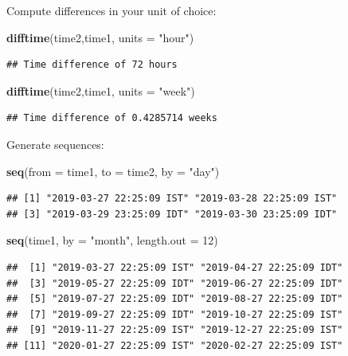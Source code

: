 \documentclass[]{book}
\newenvironment{Shaded}{\begin{snugshade}}{\end{snugshade}}
\newcommand{\DataTypeTok}[1]{\textcolor[rgb]{0.13,0.29,0.53}{#1}}
\newcommand{\DecValTok}[1]{\textcolor[rgb]{0.00,0.00,0.81}{#1}}
\newcommand{\KeywordTok}[1]{\textcolor[rgb]{0.13,0.29,0.53}{\textbf{#1}}}
\newcommand{\NormalTok}[1]{#1}
\newcommand{\StringTok}[1]{\textcolor[rgb]{0.31,0.60,0.02}{#1}}
\theoremstyle{definition}
\theoremstyle{definition}
\theoremstyle{definition}
\theoremstyle{remark}
\begin{document}
Compute differences in your unit of choice:

\begin{Shaded}
\begin{Highlighting}[]
\KeywordTok{difftime}\NormalTok{(time2,time1, }\DataTypeTok{units =}  \StringTok{"hour"}\NormalTok{)}
\end{Highlighting}
\end{Shaded}

\begin{verbatim}
## Time difference of 72 hours
\end{verbatim}

\begin{Shaded}
\begin{Highlighting}[]
\KeywordTok{difftime}\NormalTok{(time2,time1, }\DataTypeTok{units =}  \StringTok{"week"}\NormalTok{)}
\end{Highlighting}
\end{Shaded}

\begin{verbatim}
## Time difference of 0.4285714 weeks
\end{verbatim}

Generate sequences:

\begin{Shaded}
\begin{Highlighting}[]
\KeywordTok{seq}\NormalTok{(}\DataTypeTok{from =}\NormalTok{ time1, }\DataTypeTok{to =}\NormalTok{ time2, }\DataTypeTok{by =} \StringTok{"day"}\NormalTok{) }
\end{Highlighting}
\end{Shaded}

\begin{verbatim}
## [1] "2019-03-27 22:25:09 IST" "2019-03-28 22:25:09 IST"
## [3] "2019-03-29 23:25:09 IDT" "2019-03-30 23:25:09 IDT"
\end{verbatim}

\begin{Shaded}
\begin{Highlighting}[]
\KeywordTok{seq}\NormalTok{(time1, }\DataTypeTok{by =} \StringTok{"month"}\NormalTok{, }\DataTypeTok{length.out =} \DecValTok{12}\NormalTok{)}
\end{Highlighting}
\end{Shaded}

\begin{verbatim}
##  [1] "2019-03-27 22:25:09 IST" "2019-04-27 22:25:09 IDT"
##  [3] "2019-05-27 22:25:09 IDT" "2019-06-27 22:25:09 IDT"
##  [5] "2019-07-27 22:25:09 IDT" "2019-08-27 22:25:09 IDT"
##  [7] "2019-09-27 22:25:09 IDT" "2019-10-27 22:25:09 IST"
##  [9] "2019-11-27 22:25:09 IST" "2019-12-27 22:25:09 IST"
## [11] "2020-01-27 22:25:09 IST" "2020-02-27 22:25:09 IST"
\end{verbatim}
\end{document}
